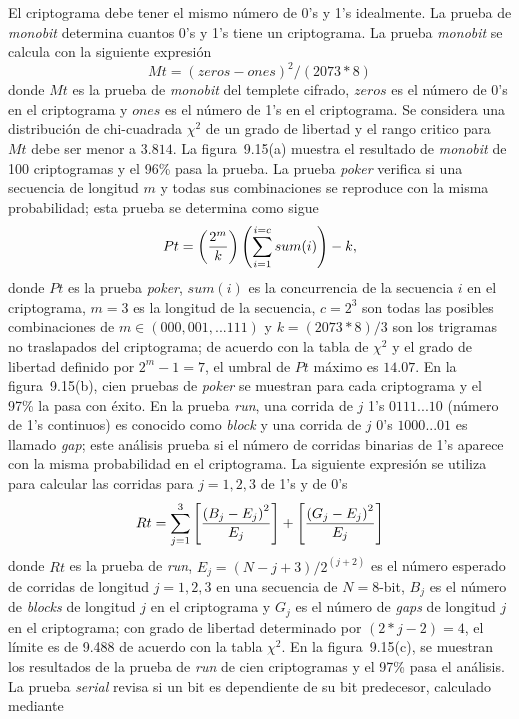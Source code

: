 El criptograma debe tener el mismo número de 0's y 1's idealmente. La prueba de \textit{monobit} determina cuantos 0's y 1's tiene un criptograma. La prueba \textit{monobit} se calcula con la siguiente expresión   
\begin{equation}
Mt = \left( zeros-ones \right)^{2}/\left(2073 \ast 8\right)
\end{equation}
donde $Mt$ es la prueba de \textit{monobit} del templete cifrado, $zeros$ es el número de 0's en el criptograma y $ones$ es el número de 1's en el criptograma. Se considera una distribución de chi-cuadrada $\chi^{2}$ de un grado de libertad y el rango critico para $Mt$ debe ser menor a $3.814$. La figura~9.15(a) muestra el resultado de \textit{monobit} de 100 criptogramas y el 96\% pasa la prueba. La prueba \textit{poker} verifica si una secuencia de longitud $m$ y todas sus combinaciones se reproduce con la misma probabilidad; esta prueba se determina como sigue 
\begin{equation}
Pt=\left(2^{m} \over k\right) \left(\sum_{i=1}^{i=c} {sum(i)}\right) - k,
\end{equation} 
donde $Pt$ es la prueba \textit{poker}, $sum(i)$ es la concurrencia de la secuencia $i$ en el criptograma, $m=3$ es la longitud de la secuencia, $c=2^{3}$ son todas las posibles combinaciones de $m\in(000,001,...111)$ y $k=(2073\ast 8)/3$ son los trigramas no traslapados del criptograma; de acuerdo con la tabla de $\chi^{2}$ y el grado de libertad definido por $2^{m}-1=7$, el umbral de $Pt$ máximo es $14.07$. En la figura~9.15(b), cien pruebas de \textit{poker} se muestran para cada criptograma y el 97\% la pasa con éxito. En la prueba \textit{run}, una corrida de $j$ 1's $0111...10$ (número de 1's continuos) es conocido como \emph{block} y una corrida de $j$ 0's $1000...01$ es llamado \emph{gap}; este análisis prueba si el número de corridas binarias de 1's aparece con la misma probabilidad en el criptograma. La siguiente expresión se utiliza para calcular las corridas para $j=1,2,3$ de 1's y de 0's
\begin{equation}
Rt=\sum_{j=1}^{3} {\left[\left(B_{j}-E_{j}\right)^{2} \over E_{j}\right] + \left[\left(G_{j}-E_{j}\right)^{2} \over E_{j}\right]}
\end{equation}
donde $Rt$  es la prueba de \textit{run}, $E_{j}=\left(N-j+3\right)/2^{\left(j+2\right)}$ es el número esperado de corridas de longitud $j=1,2,3$ en una secuencia de $N=8$-bit, $B_{j}$ es el número de \emph{blocks} de longitud $j$ en el criptograma y $G_{j}$ es el número de \emph{gaps} de longitud $j$ en el criptograma; con grado de libertad determinado por $(2\ast j-2)=4$, el límite es de 9.488 de acuerdo con la tabla $\chi^{2}$. En la figura~9.15(c), se muestran los resultados de la prueba de \textit{run} de cien criptogramas y el 97\% pasa el análisis. La prueba \textit{serial} revisa si un bit es dependiente de su bit predecesor, calculado mediante     
